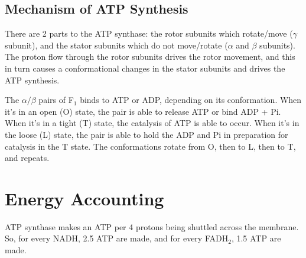 \subsection{Mechanism of ATP Synthesis}

There are 2 parts to the ATP synthase: the rotor subunits which rotate/move ($\gamma$ subunit), and the stator subunits which do not move/rotate ($\alpha$ and $\beta$ subunits).
The proton flow through the rotor subunits drives the rotor movement, and this in turn causes a conformational changes in the stator subunits and drives the ATP synthesis.

The $\alpha/\beta$ pairs of F$_1$ binds to ATP or ADP, depending on its conformation.
When it's in an open (O) state, the pair is able to release ATP or bind ADP + Pi.
When it's in a tight (T) state, the catalysis of ATP is able to occur.
When it's in the loose (L) state, the pair is able to hold the ADP and Pi in preparation for catalysis in the T state.
The conformations rotate from O, then to L, then to T, and repeats.

\section{Energy Accounting}

ATP synthase makes an ATP per 4 protons being shuttled across the membrane.
So, for every NADH, 2.5 ATP are made, and for every FADH$_2$, 1.5 ATP are made.

